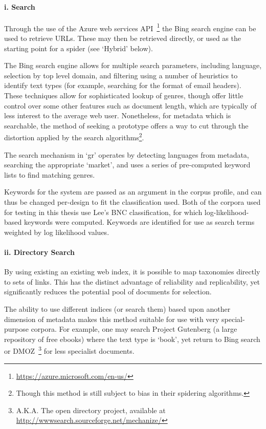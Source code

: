 \paragraph{i. Search}
Through the use of the Azure web services API~\footnote{\url{https://azure.microsoft.com/en-us/}} the Bing search engine can be used to retrieve URLs.  These may then be retrieved directly, or used as the starting point for a spider (see `Hybrid' below).

The Bing search engine allows for multiple search parameters, including language, selection by top level domain, and filtering using a number of heuristics to identify text types (for example, searching for the format of email headers).  These techniques allow for sophisticated lookup of genres, though offer little control over some other features such as document length, which are typically of less interest to the average web user.  Nonetheless, for metadata which is searchable, the method of seeking a prototype offers a way to cut through the distortion applied by the search algorithms\footnote{Though this method is still subject to bias in their spidering algorithms.}.

The search mechanism in `gr' operates by detecting languages from metadata, searching the appropriate `market', and uses a series of pre-computed keyword lists to find matching genres.

Keywords for the system are passed as an argument in the corpus profile, and can thus be changed per-design to fit the classification used.  Both of the corpora used for testing in this thesis use Lee's BNC classification, for which log-likelihood-based keywords were computed.  Keywords are identified for use as search terms weighted by log likelihood values.


\paragraph{ii. Directory Search}
By using existing an existing web index, it is possible to map taxonomies directly to sets of links.  This has the distinct advantage of reliability and replicability, yet significantly reduces the potential pool of documents for selection.

The ability to use different indices (or search them) based upon another dimension of metadata makes this method suitable for use with very special-purpose corpora.  For example, one may search Project Gutenberg (a large repository of free ebooks) where the text type is `book', yet return to Bing search or DMOZ~\footnote{A.K.A. The open directory project, available at \url{http://wwwsearch.sourceforge.net/mechanize/}} for less specialist documents.

